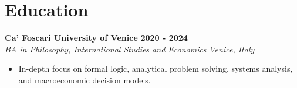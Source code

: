 \documentclass[10pt,a4paper]{article}
\newcommand{\role}[4]{%
  \textbf{#1} \hfill \textbf{#2}\\[1pt]%
  \textit{#3} \hfill \textit{#4}\\[2pt]%
}
\begin{document}
\section{Education}
\role{Ca' Foscari University of Venice}{2020 - 2024}{BA in Philosophy, International Studies and Economics}{Venice, Italy}
\begin{itemize}
  \item In-depth focus on formal logic, analytical problem solving, systems analysis, and macroeconomic decision models.
\end{itemize}
\end{document}
